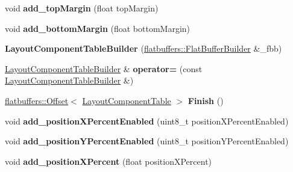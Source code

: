 \begin{DoxyCompactItemize}
void {\bfseries add\+\_\+top\+Margin} (float top\+Margin)
\item 
\mbox{\label{structflatbuffers_1_1LayoutComponentTableBuilder_a68f4715e0f01f6d6e89542fece156944}} 
void {\bfseries add\+\_\+bottom\+Margin} (float bottom\+Margin)
\item 
\mbox{\label{structflatbuffers_1_1LayoutComponentTableBuilder_a82291d1cf3f7abb3f6832b71db237f32}} 
{\bfseries Layout\+Component\+Table\+Builder} (\hyperlink{classflatbuffers_1_1FlatBufferBuilder}{flatbuffers\+::\+Flat\+Buffer\+Builder} \&\+\_\+fbb)
\item 
\mbox{\label{structflatbuffers_1_1LayoutComponentTableBuilder_a056eceed3a0266014c35743d82b5a8ff}} 
\hyperlink{structflatbuffers_1_1LayoutComponentTableBuilder}{Layout\+Component\+Table\+Builder} \& {\bfseries operator=} (const \hyperlink{structflatbuffers_1_1LayoutComponentTableBuilder}{Layout\+Component\+Table\+Builder} \&)
\item 
\mbox{\label{structflatbuffers_1_1LayoutComponentTableBuilder_adf182f3a5cbf8bed5b28be79144dc420}} 
\hyperlink{structflatbuffers_1_1Offset}{flatbuffers\+::\+Offset}$<$ \hyperlink{structflatbuffers_1_1LayoutComponentTable}{Layout\+Component\+Table} $>$ {\bfseries Finish} ()
\item 
\mbox{\label{structflatbuffers_1_1LayoutComponentTableBuilder_a99d8c49e3a8a2af79b82c69b6562fe71}} 
void {\bfseries add\+\_\+position\+X\+Percent\+Enabled} (uint8\+\_\+t position\+X\+Percent\+Enabled)
\item 
\mbox{\label{structflatbuffers_1_1LayoutComponentTableBuilder_a09af14a6900a5fda6da1fca969ec77d4}} 
void {\bfseries add\+\_\+position\+Y\+Percent\+Enabled} (uint8\+\_\+t position\+Y\+Percent\+Enabled)
\item 
\mbox{\label{structflatbuffers_1_1LayoutComponentTableBuilder_a2847647add1b063916672a358ef6d765}} 
void {\bfseries add\+\_\+position\+X\+Percent} (float position\+X\+Percent)

\end{DoxyCompactItemize}
